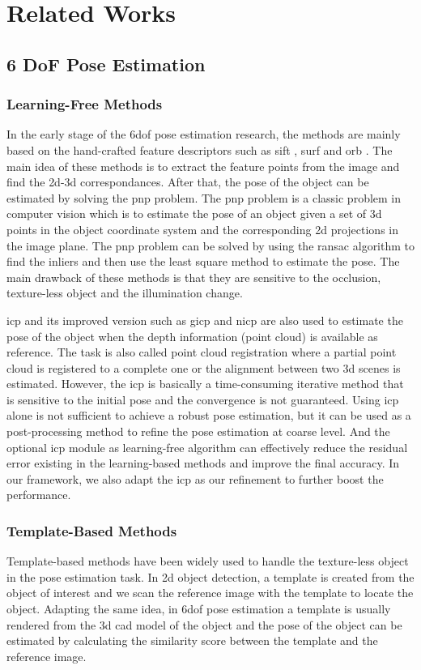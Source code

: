 \documentclass[12pt,DIV14,BCOR12mm,a4paper,footinclude=false,headinclude,parskip=half-,twoside,openright,cleardoublepage=empty,toc=index,bibliography=totoc,listof=totoc]{scrreprt}
\numberwithin{equation}{chapter}
\begin{document}
\chapter{Related Works}
\section{6 DoF Pose Estimation}
\subsection{Learning-Free Methods}
In the early stage of the \gls{6dof} pose estimation research, the methods are mainly based on the hand-crafted feature descriptors such as \gls{sift} \cite{sift}, \gls{surf} \cite{surf} and \gls{orb} \cite{6126544}. The main idea of these methods is to extract the feature points from the image and find the \gls{2d}-\gls{3d} correspondances. After that, the pose of the object can be estimated by solving the \gls{pnp} problem. The \gls{pnp} problem is a classic problem in computer vision which is to estimate the pose of an object given a set of \gls{3d} points in the object coordinate system and the corresponding \gls{2d} projections in the image plane. The \gls{pnp} problem can be solved by using the \gls{ransac} \cite{10.1145/358669.358692} algorithm to find the inliers and then use the least square method to estimate the pose. The main drawback of these methods is that they are sensitive to the occlusion, texture-less object and the illumination change. 

\gls{icp} \cite{Besl1992AMF} and its improved version such as \gls{gicp} \cite{gicp} and \gls{nicp} \cite{nicp} are also used to estimate the pose of the object when the depth information (point cloud) is available as reference. The task is also called point cloud registration where a partial point cloud is registered to a complete one or the alignment between two \gls{3d} scenes is estimated. However, the \gls{icp} is basically a time-consuming iterative method that is sensitive to the initial pose and the convergence is not guaranteed. Using \gls{icp} alone is not sufficient to achieve a robust pose estimation, but it can be used as a post-processing method to refine the pose estimation at coarse level. And the optional \gls{icp} module as learning-free algorithm can effectively reduce the residual error existing in the learning-based methods and improve the final accuracy. In our framework, we also adapt the \gls{icp} as our refinement to further boost the performance.
\subsection{Template-Based Methods}
Template-based methods have been widely used to handle the texture-less object in the pose estimation task. In \gls{2d} object detection, a template is created from the object of interest and we scan the reference image with the template to locate the object. Adapting the same idea, in \gls{6dof} pose estimation a template is usually rendered from the \gls{3d} \gls{cad} model of the object and the pose of the object can be estimated by calculating the similarity score between the template and the reference image. 
\end{document}
